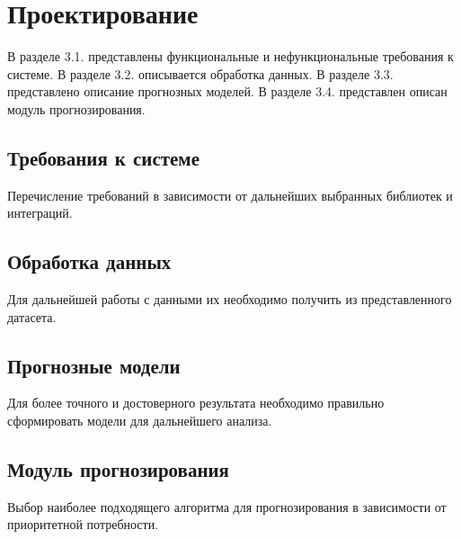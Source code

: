 \lstset{language=C, frame=L, basicstyle=\footnotesize,%
	keywordstyle=\bfseries, showstringspaces=false, xleftmargin=\parindent, numbers=none, numberstyle=\tiny, stepnumber=2, numbersep=5pt}
\newpage
\section{Проектирование}
\label{sec:Design}

В разделе 3.1. представлены функциональные и нефункциональные требования к системе. В разделе 3.2. описывается обработка данных. В разделе 3.3. представлено описание прогнозных моделей. В разделе 3.4. представлен описан модуль прогнозирования.

\subsection{Требования к системе}

Перечисление требований в зависимости от дальнейших выбранных библиотек и интеграций.

\subsection{Обработка данных}

Для дальнейшей работы с данными их необходимо получить из представленного датасета.

\subsection{Прогнозные модели}

Для более точного и достоверного результата необходимо правильно сформировать модели для дальнейшего анализа.

\subsection{Модуль прогнозирования}

Выбор наиболее подходящего алгоритма для прогнозирования в зависимости от приоритетной потребности.

